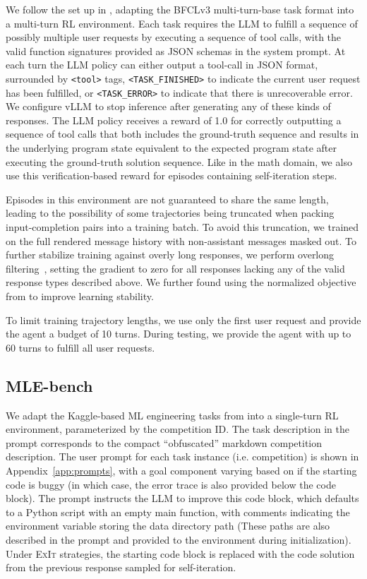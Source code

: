 \documentclass[10pt]{article} %
\newcommand{\methodname}{\textsc{ExIt}}
\begin{document}
We follow the set up in \citet{bespoke_improving_multi_turn_tool_use}, adapting the BFCLv3 multi-turn-base task format into a multi-turn RL environment. Each task requires the LLM to fulfill a sequence of possibly multiple user requests by executing a sequence of tool calls, with the valid function signatures provided as JSON schemas in the system prompt. At each turn the LLM policy can either output a tool-call in JSON format, surrounded by \texttt{<tool>} tags, \texttt{<TASK\_FINISHED>} to indicate the current user request has been fulfilled, or \texttt{<TASK\_ERROR>} to indicate that there is unrecoverable error. We configure vLLM to stop inference after generating any of these kinds of responses. The LLM policy receives a reward of 1.0 for correctly outputting a sequence of tool calls that both includes the ground-truth sequence and results in the underlying program state equivalent to the expected program state after executing the ground-truth solution sequence. Like in the math domain, we also use this verification-based reward for episodes containing self-iteration steps.

Episodes in this environment are not guaranteed to share the same length, leading to the possibility of some trajectories being truncated when packing input-completion pairs into a training batch. To avoid this truncation, we trained on the full rendered message history with non-assistant messages masked out. To further stabilize training against overly long responses, we perform overlong filtering~\citep{yu2025dapo}, setting the gradient to zero for all responses lacking any of the valid response types described above. We further found using the normalized objective from \citet{liu2025understanding} to improve learning stability.


To limit training trajectory lengths, we use only the first user request and provide the agent a budget of 10 turns. During testing, we provide the agent with up to 60 turns to fulfill all user requests. 

\subsection{MLE-bench}
\label{app:exp_details_mlebench}



We adapt the Kaggle-based ML engineering tasks from \citet{chan2024mle} into a single-turn RL environment, parameterized by the competition ID. The task description in the prompt corresponds to the compact ``obfuscated'' markdown competition description. The user prompt for each task instance (i.e. competition) is shown in Appendix~\ref{app:prompts}, with a goal component varying based on if the starting code is buggy (in which case, the error trace is also provided below the code block). The prompt instructs the LLM to improve this code block, which defaults to a Python script with an empty main function, with comments indicating the environment variable storing the data directory path (These paths are also described in the prompt and provided to the environment during initialization). Under \methodname{} strategies, the starting code block is replaced with the code solution from the previous response sampled for self-iteration. 
\end{document}
